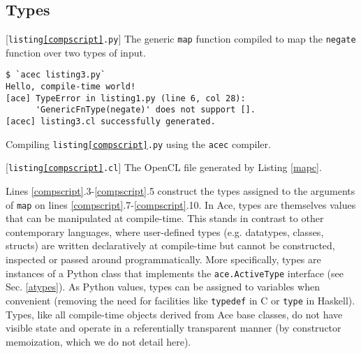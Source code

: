 \documentclass[9pt,preprint]{sigplanconf}
\begin{document}
\subsection{Types}
\begin{codelisting}

\caption{[\texttt{listing\ref{compscript}.py}] The generic \texttt{map} function compiled to map the \texttt{negate} function over two  types of input.}
\label{compscript}
\end{codelisting}
\begin{codelisting}
\begin{lstlisting}[style=Bash]
$ `acec listing3.py`
Hello, compile-time world!
[ace] TypeError in listing1.py (line 6, col 28): 
      'GenericFnType(negate)' does not support [].
[acec] listing3.cl successfully generated.
\end{lstlisting}
\caption{Compiling \texttt{listing\ref{compscript}.py} using the \texttt{acec} compiler.}
\label{mapc}
\end{codelisting}
\begin{codelisting}

\caption{[\texttt{listing\ref{compscript}.cl}] The OpenCL file generated by Listing \ref{mapc}.}
\label{mapout}
\end{codelisting}
Lines \ref{compscript}.3-\ref{compscript}.5 construct the types assigned to the arguments of \verb|map| on lines \ref{compscript}.7-\ref{compscript}.10. In Ace, types are themselves values that can be manipulated at compile-time. This stands in contrast to other contemporary languages, where user-defined types (e.g. datatypes, classes, structs) are written declaratively at compile-time but cannot be constructed, inspected or passed around programmatically. More specifically, types are instances of a Python class that implements the \verb|ace.ActiveType| interface (see Sec. \ref{atypes}). 
As Python values, types can be assigned to variables when convenient (removing the need for  facilities like \verb|typedef| in C or \verb|type| in Haskell). Types, like all compile-time objects derived from Ace base classes, do not have visible state and operate in a referentially transparent manner (by constructor memoization, which we do not detail here).%
\end{document}
